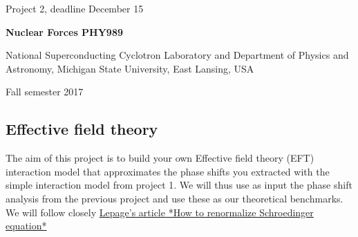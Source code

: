 \documentclass[%
oneside,                 %
final,                   %
10pt]{article}
\begin{document}

\newcommand{\exercisesection}[1]{\subsection*{#1}}






\thispagestyle{empty}

\begin{center}
{\LARGE\bf
\begin{spacing}{1.25}
Project 2, deadline  December 15
\end{spacing}
}
\end{center}


\begin{center}
{\bf Nuclear Forces PHY989}
\end{center}

    \begin{center}
\centerline{{\small National Superconducting Cyclotron Laboratory and Department of Physics and Astronomy, Michigan State University, East Lansing, USA}}
\end{center}
    

\begin{center}
Fall semester 2017
\end{center}

\vspace{1cm}


\subsection{Effective field theory}

The aim of this project is to build your own Effective field theory (EFT) interaction model that approximates the phase shifts you extracted with the simple interaction model from project 1. We will thus use as input the phase shift analysis from the previous project and use these as our theoretical benchmarks.
We will follow closely \href{{https://arxiv.org/abs/nucl-th/9706029}}{Lepage's article *How to renormalize Schroedinger equation*}
\end{document}
